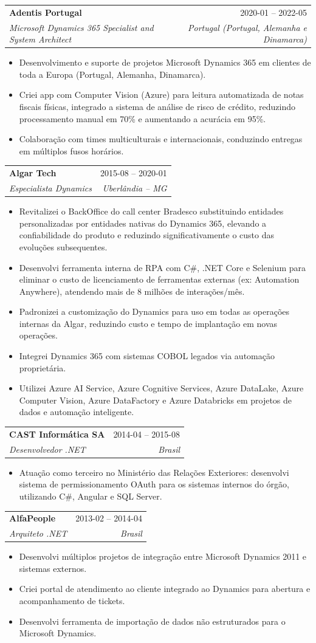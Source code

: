 \documentclass[a4paper,11pt]{article}
\makeatletter
\newcommand{\resumeItem}[1]{
  \item\small{
    {#1 \vspace{-2pt}}
  }
}
\newcommand{\resumeSubheading}[4]{
  \vspace{-1pt}\item
  \begin{tabular*}{0.97\textwidth}{l@{\extracolsep{\fill}}r}
    \textbf{#1} & #2 \\
    \textit{\small#3} & \textit{\small #4} \\
  \end{tabular*}\vspace{-5pt}
}
\newcommand{\resumeItemListStart}{\begin{itemize}}
\newcommand{\resumeItemListEnd}{\end{itemize}\vspace{-5pt}}
\makeatother
\begin{document}
\resumeSubheading
{Adentis Portugal}{2020-01 – 2022-05}
{Microsoft Dynamics 365 Specialist and System Architect}{Portugal (Portugal, Alemanha e Dinamarca)}
\resumeItemListStart
\resumeItem{Desenvolvimento e suporte de projetos Microsoft Dynamics 365 em clientes de toda a Europa (Portugal, Alemanha, Dinamarca).}
\resumeItem{Criei app com Computer Vision (Azure) para leitura automatizada de notas fiscais físicas, integrado a sistema de análise de risco de crédito, reduzindo processamento manual em 70\% e aumentando a acurácia em 95\%.}
\resumeItem{Colaboração com times multiculturais e internacionais, conduzindo entregas em múltiplos fusos horários.}
\resumeItemListEnd

\resumeSubheading
{Algar Tech}{2015-08 – 2020-01}
{Especialista Dynamics}{Uberlândia – MG}
\resumeItemListStart
\resumeItem{Revitalizei o BackOffice do call center Bradesco substituindo entidades personalizadas por entidades nativas do Dynamics 365, elevando a confiabilidade do produto e reduzindo significativamente o custo das evoluções subsequentes.}
\resumeItem{Desenvolvi ferramenta interna de RPA com C\#, .NET Core e Selenium para eliminar o custo de licenciamento de ferramentas externas (ex: Automation Anywhere), atendendo mais de 8 milhões de interações/mês.}
\resumeItem{Padronizei a customização do Dynamics para uso em todas as operações internas da Algar, reduzindo custo e tempo de implantação em novas operações.}
\resumeItem{Integrei Dynamics 365 com sistemas COBOL legados via automação proprietária.}
\resumeItem{Utilizei Azure AI Service, Azure Cognitive Services, Azure DataLake, Azure Computer Vision, Azure DataFactory e Azure Databricks em projetos de dados e automação inteligente.}
\resumeItemListEnd

\resumeSubheading
{CAST Informática SA}{2014-04 – 2015-08}
{Desenvolvedor .NET}{Brasil}
\resumeItemListStart
\resumeItem{Atuação como terceiro no Ministério das Relações Exteriores: desenvolvi sistema de permissionamento OAuth para os sistemas internos do órgão, utilizando C\#, Angular e SQL Server.}
\resumeItemListEnd

\resumeSubheading
{AlfaPeople}{2013-02 – 2014-04}
{Arquiteto .NET}{Brasil}
\resumeItemListStart
\resumeItem{Desenvolvi múltiplos projetos de integração entre Microsoft Dynamics 2011 e sistemas externos.}
\resumeItem{Criei portal de atendimento ao cliente integrado ao Dynamics para abertura e acompanhamento de tickets.}
\resumeItem{Desenvolvi ferramenta de importação de dados não estruturados para o Microsoft Dynamics.}
\resumeItemListEnd
\end{document}
